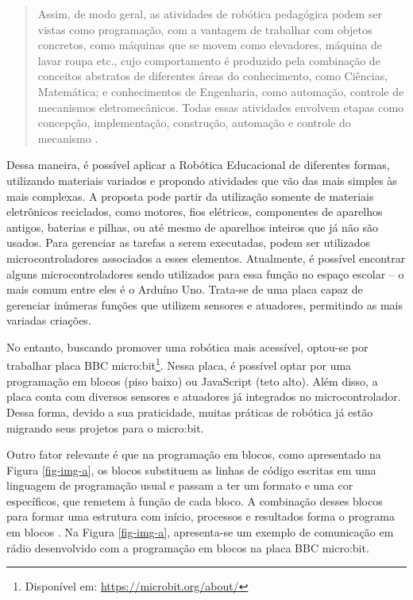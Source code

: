 \documentclass[portuguese]{textolivre}
\begin{document}
\begin{quote}
	Assim, de modo geral, as atividades de robótica pedagógica podem ser vistas como programação, com a vantagem de trabalhar com objetos concretos, como máquinas que se movem como elevadores, máquina de lavar roupa etc., cujo comportamento é produzido pela combinação de conceitos abstratos de diferentes áreas do conhecimento, como Ciências, Matemática; e conhecimentos de Engenharia, como automação, controle de mecanismos eletromecânicos. Todas essas atividades envolvem etapas como concepção, implementação, construção, automação e controle do mecanismo \cite [p. 876] {valente}.
\end{quote}

Dessa maneira, é possível aplicar a Robótica Educacional de diferentes formas, utilizando materiais variados e propondo atividades que vão das mais simples às mais complexas. A proposta pode partir da utilização somente de materiais eletrônicos reciclados, como motores, fios elétricos, componentes de aparelhos antigos, baterias e pilhas, ou até mesmo de aparelhos inteiros que já não são usados. Para gerenciar as tarefas a serem executadas, podem ser utilizados microcontroladores associados a esses elementos. Atualmente, é possível encontrar alguns microcontroladores sendo utilizados para essa função no espaço escolar -- o mais comum entre eles é o Arduíno Uno. Trata-se de uma placa capaz de gerenciar inúmeras funções que utilizem sensores e atuadores, permitindo as mais variadas criações.

No entanto, buscando promover uma robótica mais acessível,  optou-se por trabalhar placa BBC micro:bit\footnote{Disponível em: \url{https://microbit.org/about/}}. Nessa placa, é possível optar por uma programação em blocos (piso baixo) ou JavaScript (teto alto). Além disso, a placa conta com diversos sensores e atuadores já integrados no microcontrolador. Dessa forma, devido a sua praticidade, muitas práticas de robótica já estão migrando seus projetos para o micro:bit. 

Outro fator relevante é que na programação em blocos, como apresentado na Figura \ref{fig-img-a}, os blocos substituem as linhas de código escritas em uma linguagem de programação usual e passam a ter um formato e uma cor específicos, que remetem à função de cada bloco.  A combinação desses blocos para formar uma estrutura com início, processos e resultados forma o programa em blocos \cite{IDCode}. Na Figura \ref{fig-img-a}, apresenta-se um exemplo de comunicação em rádio desenvolvido com a programação em blocos na placa BBC micro:bit.
\end{document}
